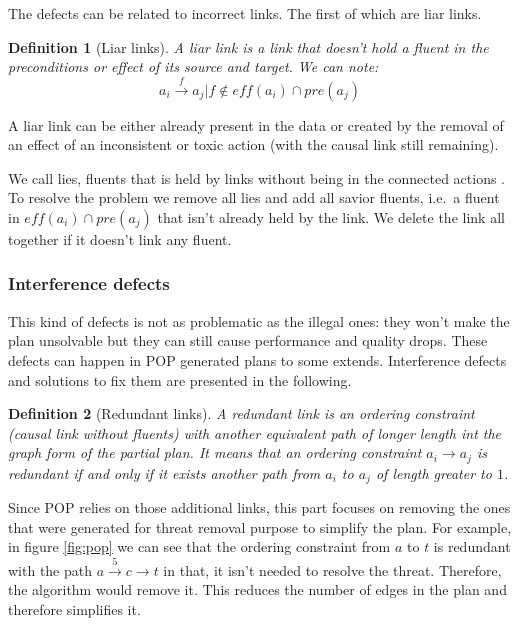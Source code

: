 \documentclass[]{article}
\newtheorem{definition}{Definition}
\begin{document}
The defects can be related to incorrect links. The first of which are
liar links.

\begin{definition}[Liar links]

A liar link is a link that doesn't hold a fluent in the preconditions or
effect of its source and target. We can note:
\[a_i \xrightarrow{f} a_j | f \notin eff(a_i) \cap pre(a_j)\]

\end{definition}

A liar link can be either already present in the data or created by the
removal of an effect of an inconsistent or toxic action (with the causal
link still remaining).

We call lies, fluents that is held by links without being in the
connected actions . To resolve the problem we remove all lies and add
all savior fluents, i.e.~a fluent in \(eff(a_i) \cap pre(a_j)\) that
isn't already held by the link. We delete the link all together if it
doesn't link any fluent.

\subsubsection{Interference defects}\label{interference-defects}

This kind of defects is not as problematic as the illegal ones: they
won't make the plan unsolvable but they can still cause performance and
quality drops. These defects can happen in POP generated plans to some
extends. Interference defects and solutions to fix them are presented in
the following.

\begin{definition}[Redundant links]

A redundant link is an ordering constraint (causal link without fluents)
with another equivalent path of longer length int the graph form of the
partial plan. It means that an ordering constraint \(a_i \to a_j\) is
redundant if and only if it exists another path from \(a_i\) to \(a_j\)
of length greater to \(1\).

\end{definition}

Since POP relies on those additional links, this part focuses on
removing the ones that were generated for threat removal purpose to
simplify the plan. For example, in figure \ref{fig:pop} we can see that
the ordering constraint from \(a\) to \(t\) is redundant with the path
\(a \xrightarrow{5} c \to t\) in that, it isn't needed to resolve the
threat. Therefore, the algorithm would remove it. This reduces the
number of edges in the plan and therefore simplifies it.
\end{document}
